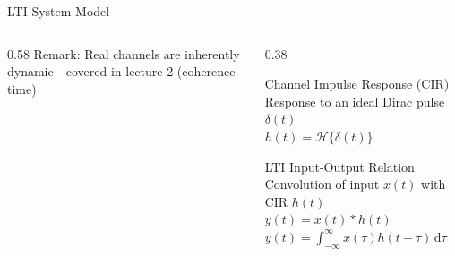 \begin{frame}{LTI System Model}
\begin{columns}[T,onlytextwidth]
\begin{column}{0.58\textwidth}
            \alert{Remark:} Real channels are inherently dynamic---covered in lecture 2 (coherence time)
        \end{column}
        \begin{column}{0.38\textwidth}
            \begin{block}{Channel Impulse Response (CIR)}
                Response to an ideal Dirac pulse $\delta(t)$\\
                \vspace{0.5em}
                \centering
                $h(t) = \mathcal{H}\{\delta(t)\}$
            \end{block}
            \begin{block}{LTI Input-Output Relation}
                Convolution of input $x(t)$ with CIR $h(t)$\\
                \vspace{0.5em}
                \centering
                $y(t) = x(t) * h(t)$ \\[0.2cm]
                $y(t) = \int_{-\infty}^{\infty} x(\tau) h(t - \tau) \,\mathrm{d}\tau$
            \end{block}
        \end{column}
    \end{columns}
\end{frame}

